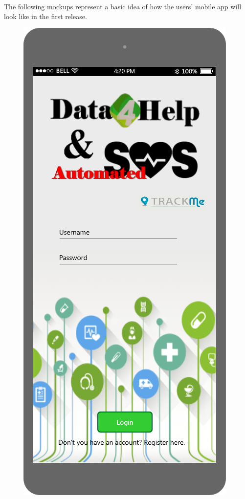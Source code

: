 The following mockups represent a basic idea of how the users' mobile app will look like in the first 
release. 

\begin{figure}[h!]
	\centering
 	 \begin{minipage}[b]{0.25\textwidth}
    		\includegraphics[width=\textwidth]{./pictures/login_user.png}

\end{minipage}
\end{figure}
